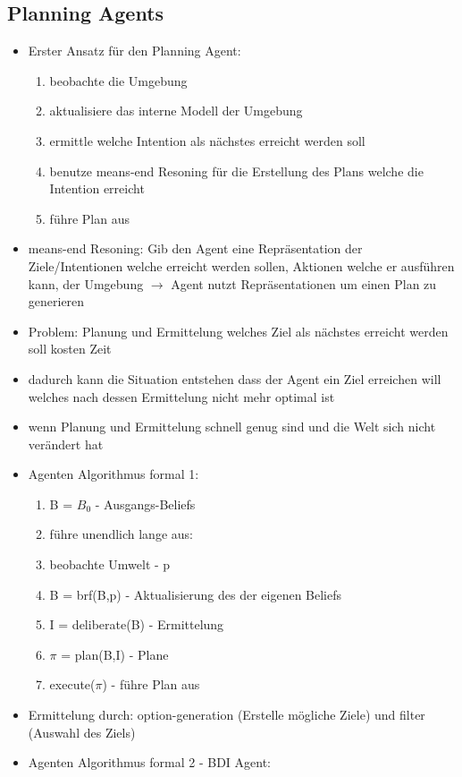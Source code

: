 \documentclass{article} %
\begin{document}
	\subsection{Planning Agents}
	\begin{itemize}
		\item Erster Ansatz für den Planning Agent:
		\begin{enumerate}
			\item beobachte die Umgebung
			\item aktualisiere das interne Modell der Umgebung
			\item ermittle welche Intention als nächstes erreicht werden soll
			\item benutze means-end Resoning für die Erstellung des Plans welche die Intention erreicht
			\item führe Plan aus
		\end{enumerate}
		\item means-end Resoning: Gib den Agent eine Repräsentation der Ziele/Intentionen welche erreicht werden sollen, Aktionen welche er ausführen kann, der Umgebung $\rightarrow$ Agent nutzt Repräsentationen um einen Plan zu generieren
		\item Problem: Planung und Ermittelung welches Ziel als nächstes erreicht werden soll kosten Zeit
		\item dadurch kann die Situation entstehen dass der Agent ein Ziel erreichen will welches nach dessen Ermittelung nicht mehr optimal ist
		\item wenn Planung und  Ermittelung schnell genug sind und die Welt sich nicht verändert hat
		\item Agenten Algorithmus formal 1:
		\begin{enumerate}
			\item B = $B_{0}$ - Ausgangs-Beliefs
			\item führe unendlich lange aus:
			\item beobachte Umwelt - p
			\item B = brf(B,p) - Aktualisierung des der eigenen Beliefs
			\item I = deliberate(B) - Ermittelung
			\item $\pi$ = plan(B,I) - Plane
			\item execute($\pi$) - führe Plan aus
		\end{enumerate}
		\item Ermittelung durch: option-generation (Erstelle mögliche Ziele) und filter (Auswahl des Ziels)
		\item Agenten Algorithmus formal 2 - BDI Agent:

\end{itemize}
\end{document}
